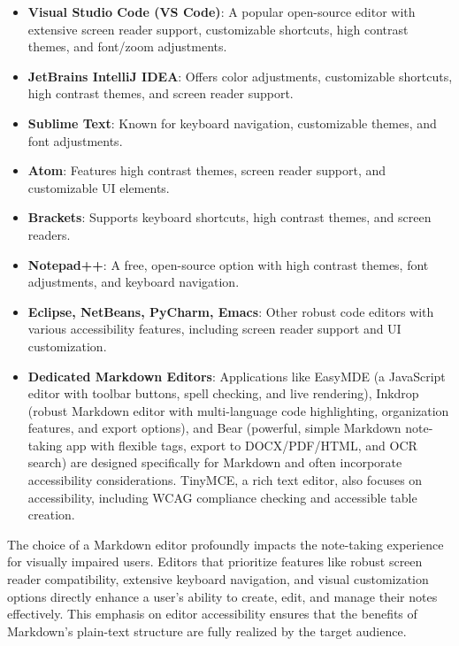 \begin{itemize}
    \item \textbf{Visual Studio Code (VS Code)}: A popular open-source editor with extensive screen reader support, customizable shortcuts, high contrast themes, and font/zoom adjustments.\cite{DailyDevEditors}
    \item \textbf{JetBrains IntelliJ IDEA}: Offers color adjustments, customizable shortcuts, high contrast themes, and screen reader support.\cite{DailyDevEditors}
    \item \textbf{Sublime Text}: Known for keyboard navigation, customizable themes, and font adjustments.\cite{DailyDevEditors}
    \item \textbf{Atom}: Features high contrast themes, screen reader support, and customizable UI elements.\cite{DailyDevEditors}
    \item \textbf{Brackets}: Supports keyboard shortcuts, high contrast themes, and screen readers.\cite{DailyDevEditors}
    \item \textbf{Notepad++}: A free, open-source option with high contrast themes, font adjustments, and keyboard navigation.\cite{DailyDevEditors}
    \item \textbf{Eclipse, NetBeans, PyCharm, Emacs}: Other robust code editors with various accessibility features, including screen reader support and UI customization.\cite{DailyDevEditors}
    \item \textbf{Dedicated Markdown Editors}: Applications like EasyMDE (a JavaScript editor with toolbar buttons, spell checking, and live rendering\cite{EasyMDE}), Inkdrop (robust Markdown editor with multi-language code highlighting, organization features, and export options\cite{Inkdrop}), and Bear (powerful, simple Markdown note-taking app with flexible tags, export to DOCX/PDF/HTML, and OCR search\cite{Bear}) are designed specifically for Markdown and often incorporate accessibility considerations. TinyMCE, a rich text editor, also focuses on accessibility, including WCAG compliance checking and accessible table creation.\cite{TinyMCE}
\end{itemize}
The choice of a Markdown editor profoundly impacts the note-taking experience for visually impaired users. Editors that prioritize features like robust screen reader compatibility, extensive keyboard navigation, and visual customization options directly enhance a user's ability to create, edit, and manage their notes effectively. This emphasis on editor accessibility ensures that the benefits of Markdown's plain-text structure are fully realized by the target audience.

